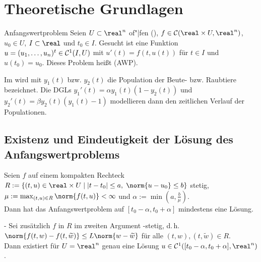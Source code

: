 \section{%
    Theoretische Grundlagen%
}

\begin{Def}{Anfangswertproblem}
    Seien $U \subset \real^n$ of"|fen (),
    $f \in \C(\real \times U, \real^n)$, $u_0 \in U$,
    $I \subset \real$ und $t_0 \in I$.
    Gesucht ist eine Funktion $u = (u_1, \dotsc, u_n)^t \in \mathcal{C}^1(I, U)$
    mit $u'(t) = f(t, u(t))$ für $t \in I$ und $u(t_0) = u_0$.
    Dieses Problem heißt  (AWP).
\end{Def}

\begin{Bsp}
    Im  wird mit $y_1(t)$ bzw. $y_2(t)$ die
    Population der Beute- bzw. Raubtiere bezeichnet.
    Die DGLs $y_1'(t) = \alpha y_1(t) (1 - y_2(t))$ und
    $y_2'(t) = \beta y_2(t) (y_1(t) - 1)$ modellieren dann den
    zeitlichen Verlauf der Populationen.
\end{Bsp}

\subsection{%
    Existenz und Eindeutigkeit der Lösung des Anfangswertproblems%
}

\begin{Satz}{}
    Seien $f$ auf einem kompakten Rechteck\\
    $R := \{(t, u) \in \real \times U \;|\;
    |t - t_0| \le a,\; \norm{u - u_0} \le b\}$ stetig,\\
    $\mu := \max_{(t, u) \in R} \norm{f(t, u)} < \infty$ und
    $\alpha := \min(a, \frac{b}{\mu})$.\\
    Dann hat das Anfangswertproblem auf $[t_0 - \alpha, t_0 + \alpha]$
    mindestens eine Lösung.
\end{Satz}

\begin{Satz}{-}
    Sei zusätzlich $f$ in $R$ im zweiten Argument -stetig,
    d.\,h.
    $\norm{f(t, w) - f(t, \widetilde{w})} \le L \norm{w - \widetilde{w}}$
    für alle $(t, w), (t, \widetilde{w}) \in R$.\\
    Dann existiert für $U = \real^n$ genau eine Lösung
    $u \in \C^1([t_0 - \alpha, t_0 + \alpha], \real^n)$.
\end{Satz}

